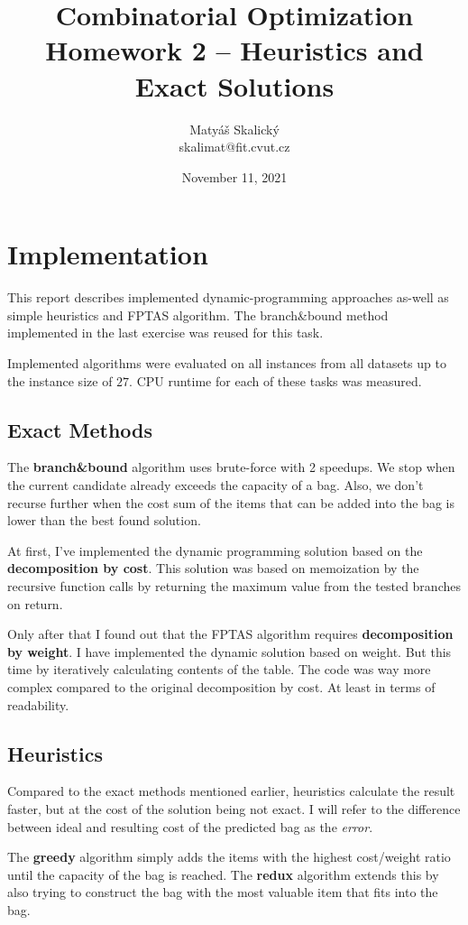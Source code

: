 \documentclass[a4paper,10pt]{article}
\title{Combinatorial Optimization\\Homework 2 – Heuristics and Exact Solutions}
\author{Matyáš Skalický\\skalimat@fit.cvut.cz}
\begin{document}
\date{November 11, 2021}
\maketitle
\tableofcontents
\medskip


\section{Implementation}
This report describes implemented dynamic-programming approaches as-well as simple heuristics and FPTAS algorithm. The branch\&bound method implemented in the last exercise was reused for this task.

Implemented algorithms were evaluated on all instances from all datasets up to the instance size of $27$. CPU runtime for each of these tasks was measured.

\subsection{Exact Methods}

The \textbf{branch\&bound} algorithm uses brute-force with 2 speedups. We stop when the current candidate already exceeds the capacity of a bag. Also, we don't recurse further when the cost sum of the items that can be added into the bag is lower than the best found solution.

At first, I've implemented the dynamic programming solution based on the \textbf{decomposition by cost}. This solution was based on memoization by the recursive function calls by returning the maximum value from the tested branches on return.

Only after that I found out that the FPTAS algorithm requires \textbf{decomposition by weight}. I have implemented the dynamic solution based on weight. But this time by iteratively calculating contents of the table. The code was way more complex compared to the original decomposition by cost. At least in terms of readability.

\subsection{Heuristics}

Compared to the exact methods mentioned earlier, heuristics calculate the result faster, but at the cost of the solution being not exact. I will refer to the difference between ideal and resulting cost of the predicted bag as the \emph{error}.

The \textbf{greedy} algorithm simply adds the items with the highest cost/weight ratio until the capacity of the bag is reached. The \textbf{redux} algorithm extends this by also trying to construct the bag with the most valuable item that fits into the bag.
\end{document}

